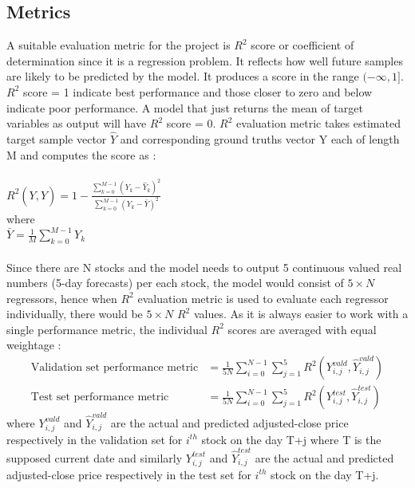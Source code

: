 \documentclass[10pt]{report}
\begin{document}
\subsection*{Metrics}
A suitable evaluation metric for the project is $R^2$ score or coefficient of determination\cite{r2score} since it is a regression problem. It reflects how well future samples are likely to be predicted by the
model. It produces a score in the range $(-\infty, 1]$. $R^2$ score = 1 indicate best performance and those closer to zero and below indicate poor performance. A model that just returns the mean of target variables as output will have $R^2$ score = 0. $R^2$ evaluation metric takes estimated target sample vector $\hat{Y}$ and corresponding ground truths vector Y each of length M and computes the score as :\\
\\
$R^2\left(Y, \hat{Y}\right) = 1 - \frac{\displaystyle\sum_{k=0}^{M-1} \left(Y_k - \hat{Y}_k\right)^2}{\displaystyle\sum_{k=0}^{M-1} \left(Y_k - \bar{Y}\right)^2}$\\
where\\
$\bar{Y} = \frac{1}{M} \displaystyle\sum_{k=0}^{M-1} Y_k$
\\
\\
Since there are N stocks and the model needs to output 5 continuous valued real numbers (5-day forecasts) per each stock, the model would consist of $5 \times N$ regressors, hence when $R^2$ evaluation metric is used to evaluate each regressor individually, there would be $5 \times N$ $R^2$ values. As it is always easier to work with a single performance metric, the individual $R^2$ scores are averaged with equal weightage :\\
\begin{align*}
\text{Validation set performance metric} &= \frac{1}{5N} \displaystyle\sum_{i=0}^{N-1} \displaystyle\sum_{j=1}^{5} R^2\left(Y_{i,j}^{vald}, \hat{Y}_{i,j}^{vald}\right)\\
\text{Test set performance metric} &= \frac{1}{5N} \displaystyle\sum_{i=0}^{N-1} \displaystyle\sum_{j=1}^{5} R^2\left(Y_{i,j}^{test}, \hat{Y}_{i,j}^{test}\right)
\end{align*}
where $Y_{i,j}^{vald}$ and $\hat{Y}_{i,j}^{vald}$ are the actual and predicted adjusted-close price respectively in the validation set for $i^{th}$ stock on the day T+j where T is the supposed current date
and similarly $Y_{i,j}^{test}$ and $\hat{Y}_{i,j}^{test}$ are the actual and predicted adjusted-close price respectively in the test set for $i^{th}$ stock on the day T+j.
\end{document}
